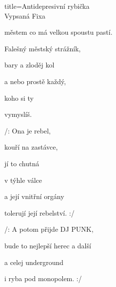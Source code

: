 \begin{song}{title=\centering Antidepresivní rybička \\\normalsize Vypsaná Fixa   \vspace*{-0.3cm}}
{\begin{minipage}[t]{0.48\textwidth}
  městem co má velkou spoustu pastí.

  Falešný městský strážník,

  bary a zloděj kol 
  
  a nebo prostě každý, 

  koho si ty 

  vymyslíš.


 /:  Ona je rebel, 
  
  kouří na zastávce,

  jí to chutná  

  v týhle válce 

  a její vnitřní orgány

  tolerují její rebelství. :/

\sloka 
  /: A potom přijde DJ PUNK,

  bude to nejlepší herec a další 

  a celej underground 

  i ryba pod monopolem. :/



\end{minipage}
}
\setcounter{Slokočet}{0}
\end{song}

